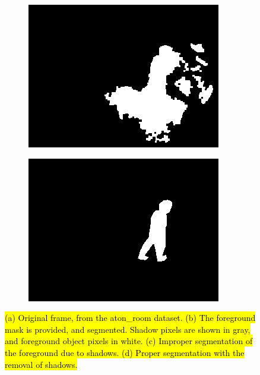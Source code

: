 \documentclass[12pt]{report}
\begin{document}
\begin{figure}
\begin{subfigure}{.49\linewidth}
    \includegraphics[width=1\linewidth]{figures/background/room_0295_blob.jpg}
    \caption{}
  \end{subfigure}
  \hfill
  \begin{subfigure}{.49\linewidth}
  \centering
    \includegraphics[width=1\linewidth]{figures/background/room_0295_clean.jpg}
    \caption{}
  \end{subfigure}
  \caption{\hl{(a) Original frame, from the aton\_room dataset. (b) The foreground mask is provided, and segmented. Shadow pixels are shown in gray, and foreground object pixels in white. (c) Improper segmentation of the foreground due to shadows. (d) Proper segmentation with the removal of shadows.}}
\label{fig:nonshadow}
\end{figure}
\end{document}
